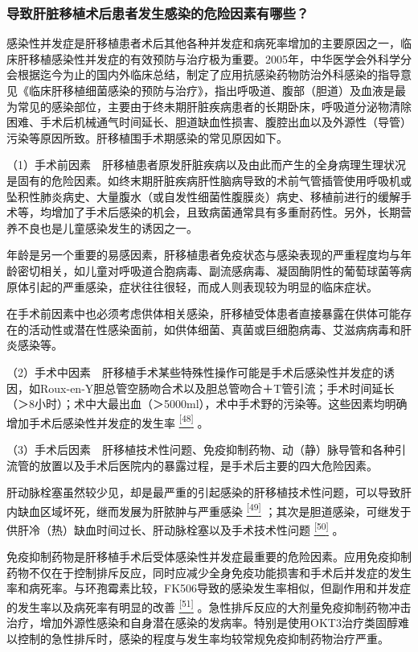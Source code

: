 \subsubsection{导致肝脏移植术后患者发生感染的危险因素有哪些？}

感染性并发症是肝移植患者术后其他各种并发症和病死率增加的主要原因之一，临床肝移植感染性并发症的有效预防与治疗极为重要。2005年，中华医学会外科学分会根据迄今为止的国内外临床总结，制定了应用抗感染药物防治外科感染的指导意见《临床肝移植细菌感染的预防与治疗》，指出呼吸道、腹部（胆道）及血液是最为常见的感染部位，主要由于终未期肝脏疾病患者的长期卧床，呼吸道分泌物清除困难、手术后机械通气时间延长、胆道缺血性损害、腹腔出血以及外源性（导管）污染等原因所致。肝移植围手术期感染的常见原因如下。

（1）手术前因素　肝移植患者原发肝脏疾病以及由此而产生的全身病理生理状况是固有的危险因素。如终末期肝脏疾病肝性脑病导致的术前气管插管使用呼吸机或坠积性肺炎病史、大量腹水（或自发性细菌性腹膜炎）病史、移植前进行的缓解手术等，均增加了手术后感染的机会，且致病菌通常具有多重耐药性。另外，长期营养不良也是儿童感染发生的诱因之一。

年龄是另一个重要的易感因素，肝移植患者免疫状态与感染表现的严重程度均与年龄密切相关，如儿童对呼吸道合胞病毒、副流感病毒、凝固酶阴性的葡萄球菌等病原体引起的严重感染，症状往往很轻，而成人则表现较为明显的临床症状。

在手术前因素中也必须考虑供体相关感染，肝移植受体患者直接暴露在供体可能存在的活动性或潜在性感染面前，如供体细菌、真菌或巨细胞病毒、艾滋病病毒和肝炎感染等。

（2）手术中因素　肝移植手术某些特殊性操作可能是手术后感染性并发症的诱因，如Roux-en-Y胆总管空肠吻合术以及胆总管吻合＋T管引流；手术时间延长（＞8小时）；术中大最出血（＞5000ml），术中手术野的污染等。这些因素均明确增加手术后感染性并发症的发生率
\protect\hyperlink{text00020.htmlux5cux23ch48-19}{\textsuperscript{{[}48{]}}}
。

（3）手术后因素　肝移植技术性问题、免疫抑制药物、动（静）脉导管和各种引流管的放置以及手术后医院内的暴露过程，是手术后主要的四大危险因素。

肝动脉栓塞虽然较少见，却是最严重的引起感染的肝移植技术性问题，可以导致肝内缺血区域坏死，继而发展为肝脓肿与严重感染
\protect\hyperlink{text00020.htmlux5cux23ch49-19}{\textsuperscript{{[}49{]}}}
；其次是胆道感染，可继发于供肝冷（热）缺血时间过长、肝动脉栓塞以及手术技术性问题
\protect\hyperlink{text00020.htmlux5cux23ch50-19}{\textsuperscript{{[}50{]}}}
。

免疫抑制药物是肝移植手术后受体感染性并发症最重要的危险因素。应用免疫抑制药物不仅在于控制排斥反应，同时应减少全身免疫功能损害和手术后并发症的发生率和病死率。与环孢霉素比较，FK506导致的感染发生率相似，但副作用和并发症的发生率以及病死率有明显的改善
\protect\hyperlink{text00020.htmlux5cux23ch51-19}{\textsuperscript{{[}51{]}}}
。急性排斥反应的大剂量免疫抑制药物冲击治疗，增加外源性感染和自身潜在感染的发病率。特别是使用OKT3治疗类固醇难以控制的急性排斥时，感染的程度与发生率均较常规免疫抑制药物治疗严重。


